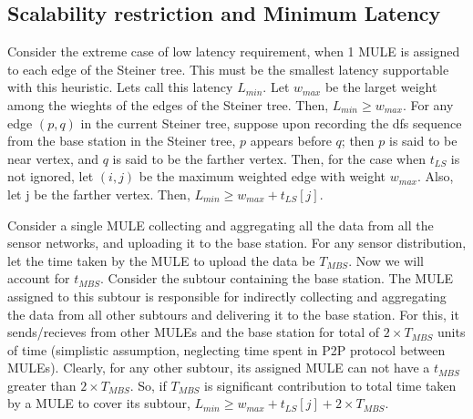 \pagebreak

\subsection{Scalability restriction and Minimum Latency}
Consider the extreme case of low latency requirement, when 1 MULE is assigned to each edge of the Steiner tree. This must be the smallest latency supportable with this heuristic. Lets call this latency $L_{min}$. Let $w_{max}$ be the larget weight among the wieghts of the edges of the Steiner tree. Then, $L_{min} \ge w_{max}$.
For any edge $(p,q)$ in the current Steiner tree, suppose upon recording the dfs sequence from the base station in the Steiner tree, $p$ appears before $q$; then $p$ is said to be near vertex, and $q$ is said to be the farther vertex. Then, for the case when $t_{LS}$ is not ignored, let $(i,j)$ be the maximum weighted edge with weight $w_{max}$. Also, let j be the farther 
vertex. Then, $L_{min} \ge w_{max}+t_{LS}[j]$.

Consider a single MULE collecting and aggregating all the data from all the sensor networks, and uploading it to the base station. For any sensor distribution, let the time taken by the MULE to upload the data be $T_{MBS}$. Now we will account for $t_{MBS}$. Consider the subtour containing the base station. The MULE assigned to this subtour is responsible for indirectly collecting and aggregating the data from all other subtours and delivering it to the base station. For this, it sends/recieves from other MULEs and the base station for total of $2 \times T_{MBS}$ units of time (simplistic assumption, neglecting time spent in P2P protocol between MULEs). Clearly, for any other subtour, its assigned MULE can not have a $t_{MBS}$ greater than $2 \times T_{MBS}$. So, if $T_{MBS}$ is significant contribution to total time taken by a MULE to cover its subtour, $L_{min} \ge w_{max}+t_{LS}[j]+2 \times T_{MBS}$.
